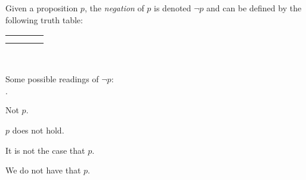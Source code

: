 \begin{definition}[Negation]
    \begin{center}
        \begin{minipage}[t]{.55\linewidth}
            Given a proposition \(p\), the \emph{negation} of \(p\)
            is denoted \(\neg p\) and can be defined by the following truth table:
            \begin{table}[H]
                \centering
                \label{tab:not}
                \begin{tabular}{|Cc||Cc|} \hline
                     &  \\ \hline
                    \thead{\(\top\)} &  \\
                    \thead{\(\bot\)} &  \\ \hline
                \end{tabular}
            \end{table}
        \end{minipage}%
        \begin{minipage}[t]{.05\linewidth}
            ~
        \end{minipage}%
        \begin{minipage}[t]{.4\linewidth}
            Some possible readings of \(\neg p\):\\
            \begin{list}{\(\cdot\)}{}
                \item
                    Not \(p\).
                \item
                    \(p\) does not hold.
                \item
                    It is not the case that \(p\).
                \item
                    We do not have that \(p\).
            \end{list}
        \end{minipage}
    \end{center}
\end{definition}

